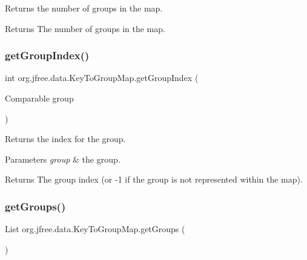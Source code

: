 Returns the number of groups in the map.

\begin{DoxyReturn}{Returns}
The number of groups in the map. 
\end{DoxyReturn}
\mbox{\label{classorg_1_1jfree_1_1data_1_1_key_to_group_map_aedd18f19547a3ea5b0bbc2c66b5955da}} 
\subsubsection{\texorpdfstring{get\+Group\+Index()}{getGroupIndex()}}
{\footnotesize\ttfamily int org.\+jfree.\+data.\+Key\+To\+Group\+Map.\+get\+Group\+Index (\begin{DoxyParamCaption}\item[{Comparable}]{group }\end{DoxyParamCaption})}

Returns the index for the group.


\begin{DoxyParams}{Parameters}
{\em group} & the group.\\
\hline
\end{DoxyParams}
\begin{DoxyReturn}{Returns}
The group index (or -\/1 if the group is not represented within the map). 
\end{DoxyReturn}
\mbox{\label{classorg_1_1jfree_1_1data_1_1_key_to_group_map_a180ffccd4ce5cef6a97905fd65239e35}} 
\subsubsection{\texorpdfstring{get\+Groups()}{getGroups()}}
{\footnotesize\ttfamily List org.\+jfree.\+data.\+Key\+To\+Group\+Map.\+get\+Groups (\begin{DoxyParamCaption}{ }\end{DoxyParamCaption})}

